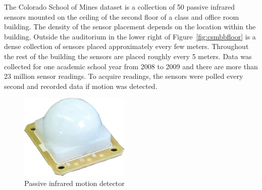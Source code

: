 \documentclass{acm_proc_article-sp}
\begin{document}
The Colorado School of Mines dataset is a collection of 50 passive infrared sensors mounted on the ceiling of the second floor of a class and office room building.  The density of the sensor placement depends on the location within the building.  Outside the auditorium in the lower right of Figure~\ref{fig:csmbbfloor} is a dense collection of sensors placed approximately every few meters.  Throughout the rest of the building the sensors are placed roughly every 5 meters.  Data was collected for one academic school year from 2008 to 2009 and there are more than 23 million sensor readings.  To acquire readings, the sensors were polled every second and recorded data if motion was detected.  

\begin{figure}[h]
\centering
\includegraphics[width = .4\linewidth]{pir_sensor.png}
\caption{Passive infrared motion detector}
\label{fig:pirsensor}
\end{figure}
\end{document}
